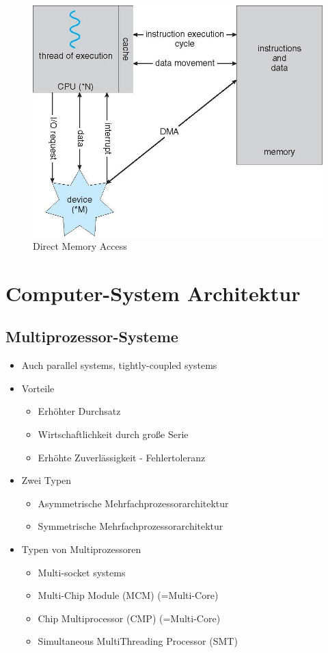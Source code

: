 \documentclass[a4paper]{scrreprt}
\begin{document}
\begin{figure}[ht]
\centering
\includegraphics[scale=0.4]{graphics/dma.png}
\caption{Direct Memory Access}
\end{figure}

\section{Computer-System Architektur}
\subsection{Multiprozessor-Systeme}
\begin{itemize}
	\item Auch parallel systems, tightly-coupled systems
	\item Vorteile
		\begin{itemize}
			\item Erhöhter Durchsatz
			\item Wirtschaftlichkeit durch große Serie
			\item Erhöhte Zuverlässigkeit - Fehlertoleranz
		\end{itemize}
	\item Zwei Typen
		\begin{itemize}
			\item Asymmetrische Mehrfachprozessorarchitektur
			\item Symmetrische Mehrfachprozessorarchitektur
		\end{itemize}
	\item Typen von Multiprozessoren
		\begin{itemize}
			\item Multi-socket systems
			\item Multi-Chip Module (MCM) (=Multi-Core)
			\item Chip Multiprocessor (CMP) (=Multi-Core)
			\item Simultaneous MultiThreading Processor (SMT)
		\end{itemize}
\end{itemize}
\end{document}
